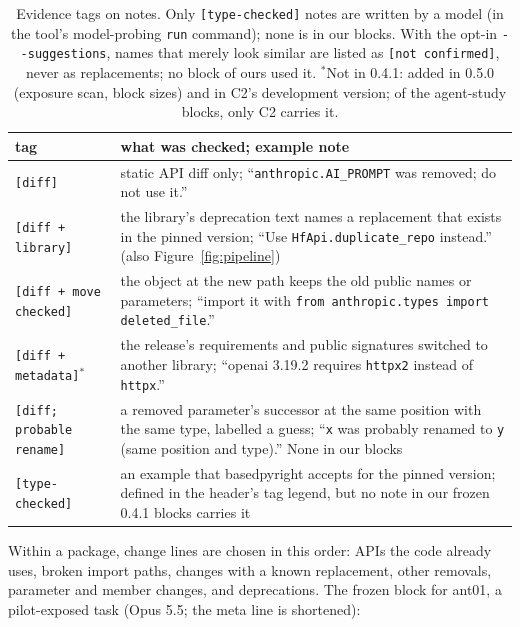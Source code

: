 \documentclass[11pt]{article}
\newcommand{\code}[1]{\texttt{#1}}
\newcommand{\flag}[1]{\texttt{-{}-#1}}%
\begin{document}
\begin{table}[t]
\centering
\footnotesize
\setlength{\tabcolsep}{3pt}
\begin{tabular}{>{\raggedright\arraybackslash}p{}>{\raggedright\arraybackslash}p{}}
\toprule
tag & what was checked; example note \\
\midrule
\code{[diff]} & static API diff only; ``\code{anthropic.AI\_PROMPT} was removed; do not use it.'' \\
\code{[diff + library]} & the library's deprecation text names a replacement that exists in the pinned version; ``Use \code{HfApi.duplicate\_repo} instead.'' (also Figure~\ref{fig:pipeline}) \\
\code{[diff + move checked]} & the object at the new path keeps the old public names or parameters; ``import it with \code{from anthropic.types import deleted\_file}.'' \\
\code{[diff + metadata]}$^{*}$ & the release's requirements and public signatures switched to another library; ``openai 3.19.2 requires \code{httpx2} instead of \code{httpx}.'' \\
\code{[diff; probable rename]} & a removed parameter's successor at the same position with the same type, labelled a guess; ``\code{x} was probably renamed to \code{y} (same position and type).'' None in our blocks \\
\code{[type-\allowbreak checked]} & an example that basedpyright accepts for the pinned version; defined in the header's tag legend, but no note in our frozen 0.4.1 blocks carries it \\
\bottomrule
\end{tabular}
\caption{Evidence tags on notes. Only \code{[type-checked]} notes are written by a model (in the tool's model-probing \code{run} command); none is in our blocks. With the opt-in \flag{suggestions}, names that merely look similar are listed as \code{[not confirmed]}, never as replacements; no block of ours used it. $^{*}$Not in 0.4.1: added in 0.5.0 (exposure scan, block sizes) and in C2's development version; of the agent-study blocks, only C2 carries it.}
\label{tab:tags}
\end{table}

Within a package, change lines are chosen in this order: APIs the code already uses, broken import paths, changes with a known replacement, other removals, parameter and member changes, and deprecations.
The frozen block for ant01, a pilot-exposed task (Opus 5.5; the meta line is shortened):
\end{document}
